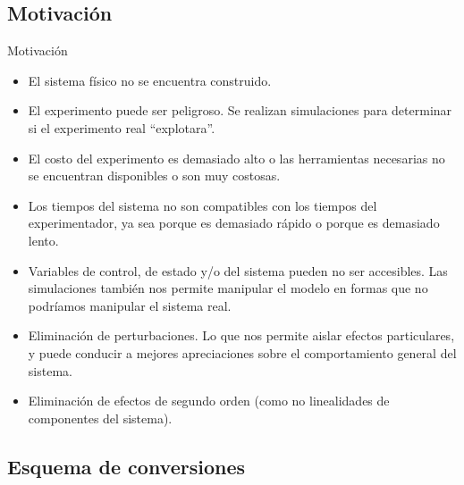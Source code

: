 \documentclass[10pt,presentation]{beamer}
\newcommand{\quotes}[1]{``#1''}
\begin{document}
	\subsection{Motivación}
\begin{frame}{Motivación}
\begin{itemize}
	\item<1-> El sistema físico no se encuentra construido. 
	
	\item<2-> El experimento puede ser peligroso. Se realizan simulaciones para determinar si el experimento real \quotes{explotara}.

	\item<3-> El costo del experimento es demasiado alto o las herramientas necesarias no se encuentran disponibles o son muy costosas.

	\item<4-> Los tiempos del sistema no son compatibles con los tiempos del experimentador, ya sea porque es demasiado rápido o porque es demasiado lento.

	\item<5-> Variables de control, de estado y/o del sistema pueden no ser accesibles. Las simulaciones también nos permite manipular el modelo en formas que no podríamos manipular el sistema real.

	\item<6-> Eliminación de perturbaciones. Lo que nos permite aislar efectos particulares, y puede conducir a mejores apreciaciones sobre el comportamiento general del sistema.

	\item<7-> Eliminación de efectos de segundo orden (como no linealidades de componentes del sistema). 
\end{itemize}
\end{frame}

	\subsection{Esquema de conversiones}
\end{document}
